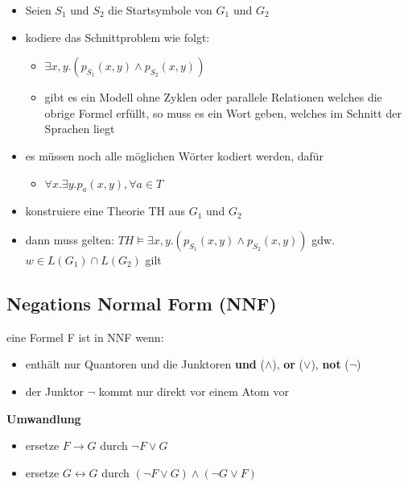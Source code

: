 \documentclass[12pt,a4paper]{article}
\begin{document}
\begin{itemize}
\item Seien $S_1$ und $S_2$ die Startsymbole von $G_1$ und $G_2$
\item kodiere das Schnittproblem wie folgt:
\begin{itemize}
\item $\exists x,y.(p_{S_1}(x,y) \land p_{S_2}(x,y))$
\item gibt es ein Modell ohne Zyklen oder parallele Relationen welches die obrige Formel erfüllt, so muss es ein Wort geben, welches im Schnitt der Sprachen liegt
\end{itemize}
\item es müssen noch alle möglichen Wörter kodiert werden, dafür
\begin{itemize}
\item $\forall x. \exists y.p_a(x,y), \forall a\in T$
\end{itemize}
\item konstruiere eine Theorie TH aus $G_1$ und $G_2$
\item dann muss gelten: $TH \models \exists x,y.(p_{S_1}(x,y) \land p_{S_2}(x,y))$ gdw. $w\in L(G_1) \cap L(G_2)$ gilt
\end{itemize}

\subsection{Negations Normal Form (NNF)}
eine Formel F ist in NNF wenn:
\begin{itemize}
\item enthält nur Quantoren und die Junktoren \textbf{und} ($\land$), \textbf{or} ($\lor$), \textbf{not} ($\lnot$)
\item der Junktor $\lnot$ kommt nur direkt vor einem Atom vor
\end{itemize}
\textbf{Umwandlung}
\begin{itemize}
\item ersetze $F \rightarrow G$ durch $\lnot F \lor G$
\item ersetze $G \leftrightarrow G$ durch $(\lnot F \lor G) \land (\lnot G \lor F)$
\end{itemize}
\end{document}
